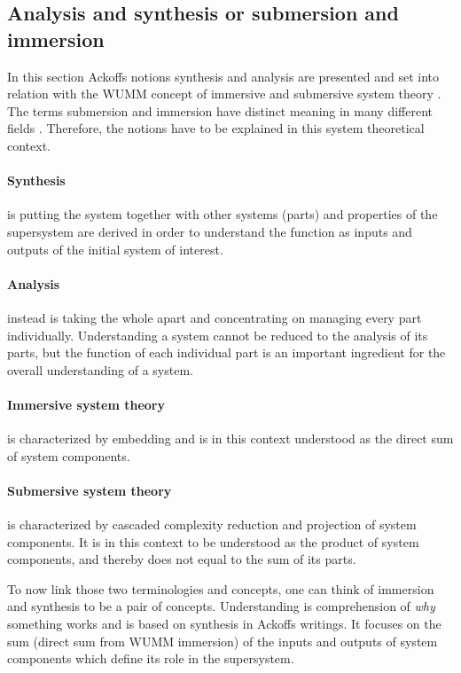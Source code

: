 \documentclass[a4paper,11pt]{article}
\begin{document}
\subsection{Analysis and synthesis or submersion and immersion}
\label{sec:analysis_and_synthesis_or_submersion_and_imersion}
In this section Ackoffs notions synthesis and analysis are presented and set
into relation with the WUMM concept of immersive and submersive system theory
\cite[p.~21]{grabe2020seminar}.  The terms submersion and immersion have
distinct meaning in many different fields \cite{van2005new}
\cite{hakuta1987synthesis}. Therefore, the notions have to be explained in
this system theoretical context.

\paragraph{Synthesis}
is putting the system together with other systems (parts) and properties of
the supersystem are derived in order to understand the function as inputs and
outputs of the initial system of interest.

\paragraph{Analysis}
instead is taking the whole apart and concentrating on managing every part
individually. Understanding a system cannot be reduced to the analysis of its
parts, but the function of each individual part is an important ingredient for
the overall understanding of a system.

\paragraph{Immersive system theory}
is characterized by embedding and is in this context understood as the direct
sum of system components.

\paragraph{Submersive system theory}
is characterized by cascaded complexity reduction and projection of system
components. It is in this context to be understood as the product of system
components, and thereby does not equal to the sum of its parts.  
\bigskip

To now link those two terminologies and concepts, one can think of immersion
and synthesis to be a pair of concepts. Understanding is comprehension of
\textit{why} something works and is based on synthesis in Ackoffs writings. It
focuses on the sum (direct sum from WUMM immersion) of the inputs and outputs
of system components which define its role in the supersystem.
\end{document}
